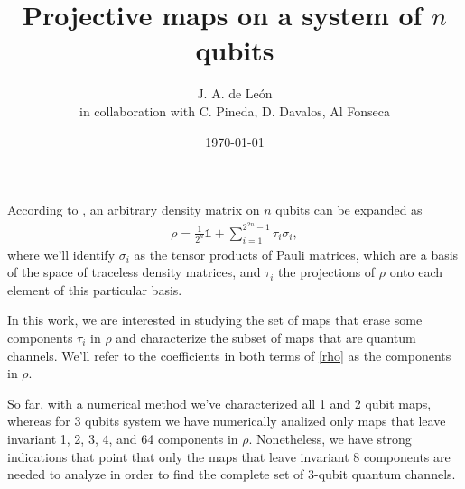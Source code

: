 \documentclass[11pt,dvipsnames]{article} %
\begin{document}
\title{Projective maps on a system of $n$ qubits} 
\author{J. A. de León\\ \small{in collaboration with C. Pineda, D. Davalos, Al Fonseca}}


\date{\today}  

\maketitle
According to \cite{bengtsson_zyczkowski_2017}, an arbitrary density matrix on $n$  
qubits can be expanded as
\begin{align}
  \rho = \frac{1}{2^n}\mathbb{1} + \sum _{i=1}^{2^{2n}-1}\tau _i\sigma _i,
	\label{rho}
\end{align}
where we'll identify $\sigma _i$ as the tensor products of Pauli 
matrices, which are a basis of the space of traceless  density matrices, and 
$\tau_i$ the projections of $\rho$ onto each element of this particular
basis.



In this work, we are interested in studying the set of maps that erase
some components $\tau_i$ in $\rho$ and characterize the subset of maps
that are quantum channels. We'll refer to the coefficients in both terms of 
\eqref{rho} as the components in $\rho$. 


So far, with a numerical method we've characterized all 1 and 2 qubit maps, 
whereas for 3 qubits system we have numerically analized only maps that leave 
invariant 1, 2, 3, 4, and 64 components in $\rho$. Nonetheless, we have strong
indications that point that only the maps that leave invariant 8 components are 
needed to analyze in order to find the complete set of 3-qubit quantum 
channels.
\end{document}
